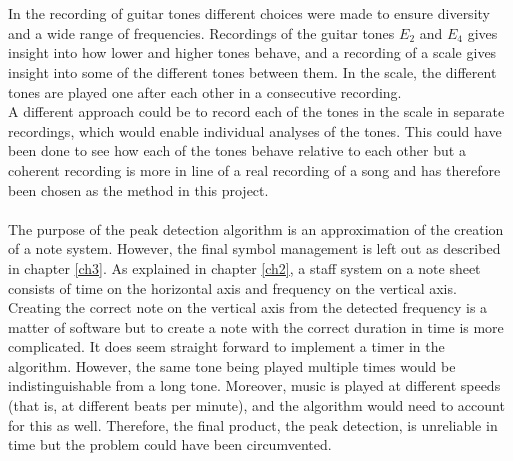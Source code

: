 \\ \\
In the recording of guitar tones different choices were made to ensure diversity and a wide range of frequencies.
Recordings of the guitar tones $E_2$ and $E_4$ gives insight into how lower and higher tones behave, and a recording of a scale gives insight into some of the different tones between them. In the scale, the different tones are played one after each other in a consecutive recording. \\
A different approach could be to record each of the tones in the scale in separate recordings, which would enable individual analyses of the tones. This could have been done to see how each of the tones behave relative to each other but a coherent recording is more in line of a real recording of a song and has therefore been chosen as the method in this project.
\\ \\
The purpose of the peak detection algorithm is an approximation  of the creation of a note system. However, the final symbol management is left out as described in chapter \ref{ch3}. As explained in chapter \ref{ch2}, a staff system on a note sheet consists of time on the horizontal axis and frequency on the vertical axis. Creating the correct note on the vertical axis from the detected frequency is a matter of software but to create a note with the correct duration in time is more complicated. It does seem straight forward to implement a timer in the algorithm. However, the same tone being played multiple times would be indistinguishable from a long tone. Moreover, music is played at different speeds (that is, at different beats per minute), and the algorithm would need to account for this as well. Therefore, the final product, the peak detection, is unreliable in time but the problem could have been circumvented.
